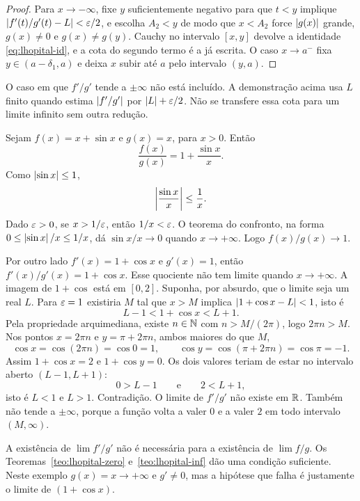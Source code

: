 \documentclass[11pt,a4paper]{article}
\begin{document}
\begin{proof}
Para $x\to-\infty$, fixe $y$ suficientemente negativo para que $t<y$ implique $\left\lvert f'(t)/g'(t)-L \right\rvert<\varepsilon/2$, e escolha $A_2<y$ de modo que $x<A_2$ force $\left\lvert g(x) \right\rvert$ grande, $g(x)\neq 0$ e $g(x)\neq g(y)$. Cauchy no intervalo $[x,y]$ devolve a identidade \eqref{eq:lhopital-id}, e a cota do segundo termo é a já escrita. O caso $x\to a^-$ fixa $y\in(a-\delta_1,a)$ e deixa $x$ subir até $a$ pelo intervalo $(y,a)$.
\end{proof}

\begin{observacao}
O caso em que $f'/g'$ tende a $\pm\infty$ não está incluído. A demonstração acima usa $L$ finito quando estima $\left\lvert f'/g' \right\rvert$ por $\left\lvert L \right\rvert+\varepsilon/2$. Não se transfere essa cota para um limite infinito sem outra redução.
\end{observacao}

\begin{contraexemplo}
Sejam $f(x)=x+\sin x$ e $g(x)=x$, para $x>0$. Então
\[
\frac{f(x)}{g(x)}=1+\frac{\sin x}{x}.
\]
Como $\left\lvert \sin x \right\rvert\le 1$,
\[
\left\lvert \frac{\sin x}{x} \right\rvert\le\frac{1}{x}.
\]
Dado $\varepsilon>0$, se $x>1/\varepsilon$, então $1/x<\varepsilon$. O teorema do confronto, na forma $0\le\left\lvert \sin x \right\rvert/x\le 1/x$, dá $\sin x/x\to 0$ quando $x\to+\infty$. Logo $f(x)/g(x)\to 1$.

Por outro lado $f'(x)=1+\cos x$ e $g'(x)=1$, então $f'(x)/g'(x)=1+\cos x$. Esse quociente não tem limite quando $x\to+\infty$. A imagem de $1+\cos$ está em $[0,2]$. Suponha, por absurdo, que o limite seja um real $L$. Para $\varepsilon=1$ existiria $M$ tal que $x>M$ implica $\left\lvert 1+\cos x-L \right\rvert<1$, isto é
\[
L-1<1+\cos x<L+1.
\]
Pela propriedade arquimediana, existe $n\in\mathbb{N}$ com $n>M/(2\pi)$, logo $2\pi n>M$. Nos pontos $x=2\pi n$ e $y=\pi+2\pi n$, ambos maiores do que $M$,
\[
\cos x=\cos(2\pi n)=\cos 0=1,\qquad \cos y=\cos(\pi+2\pi n)=\cos\pi=-1.
\]
Assim $1+\cos x=2$ e $1+\cos y=0$. Os dois valores teriam de estar no intervalo aberto $(L-1,L+1)$:
\[
0>L-1\qquad\text{e}\qquad 2<L+1,
\]
isto é $L<1$ e $L>1$. Contradição. O limite de $f'/g'$ não existe em $\mathbb{R}$. Também não tende a $\pm\infty$, porque a função volta a valer $0$ e a valer $2$ em todo intervalo $(M,\infty)$.

A existência de $\lim f'/g'$ não é necessária para a existência de $\lim f/g$. Os Teoremas~\ref{teo:lhopital-zero} e~\ref{teo:lhopital-inf} dão uma condição suficiente. Neste exemplo $g(x)=x\to+\infty$ e $g'\neq 0$, mas a hipótese que falha é justamente o limite de $(1+\cos x)$.
\end{contraexemplo}
\end{document}
